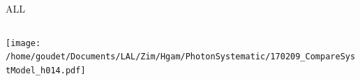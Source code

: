 \documentclass[bigger]{beamer}
\begin{document}
\begin{frame}[label={sec:orgc589fb6}]{ALL}
\begin{columns}
\begin{column}{0.5\columnwidth}
\begin{center}
\texttt{[image: /home/goudet/Documents/LAL/Zim/Hgam/PhotonSystematic/170209\_CompareSystModel\_h014.pdf]}
\end{center}
\end{column}
\end{columns}
\end{frame}
\end{document}

